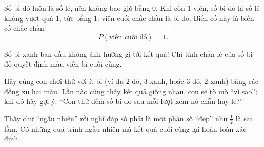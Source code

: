 {
Số bi đỏ luôn là số lẻ, nên không bao giờ bằng $0$. Khi còn $1$ viên, số bi đỏ là số lẻ không vượt quá $1$, tức bằng $1$: viên cuối chắc
chắn là bi đỏ. Biến cố này là biến cố chắc chắn:
\[P(\text{viên cuối đỏ})=1.\]
\begin{tipbox}Số bi xanh ban đầu không ảnh hưởng gì tới kết quả! Chỉ tính chẵn lẻ của số bi đỏ quyết định màu viên bi cuối cùng.\end{tipbox}
\begin{parentbox}Hãy cùng con chơi thử với ít bi (ví dụ $2$ đỏ, $3$ xanh, hoặc $3$ đỏ, $2$ xanh) bằng các đồng xu hai màu. Lần nào cũng thấy
kết quả giống nhau, con sẽ tò mò ``vì sao''; khi đó hãy gợi ý: ``Con thử đếm số bi đỏ sau mỗi lượt xem nó chẵn hay lẻ?''\end{parentbox}
\begin{warnbox}Thấy chữ ``ngẫu nhiên'' rồi nghĩ đáp số phải là một phân số ``đẹp'' như $\frac12$ là sai lầm. Có những quá trình ngẫu nhiên mà kết quả cuối
cùng lại hoàn toàn xác định.\end{warnbox}
}

